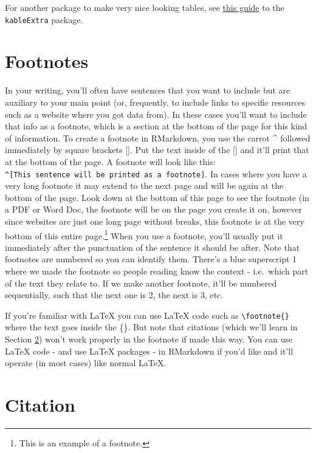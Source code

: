 \documentclass[
  12pt,
]{book}
\begin{document}
For another package to make very nice looking tables, see \href{https://cran.r-project.org/web/packages/kableExtra/vignettes/awesome_table_in_html.html}{this guide} to the \texttt{kableExtra} package.

\hypertarget{footnotes}{%
\section{Footnotes}\label{footnotes}}

In your writing, you'll often have sentences that you want to include but are auxiliary to your main point (or, frequently, to include links to specific resources such as a website where you got data from). In these cases you'll want to include that info as a footnote, which is a section at the bottom of the page for this kind of information. To create a footnote in RMarkdown, you use the carrot \^{} followed immediately by square brackets {[}{]}. Put the text inside of the {[}{]} and it'll print that at the bottom of the page. A footnote will look like this: \texttt{\^{}{[}This\ sentence\ will\ be\ printed\ as\ a\ footnote{]}}. In cases where you have a very long footnote it may extend to the next page and will be again at the bottom of the page. Look down at the bottom of this page to see the footnote (in a PDF or Word Doc, the footnote will be on the page you create it on, however since websites are just one long page without breaks, this footnote is at the very bottom of this entire page.\footnote{This is an example of a footnote.} When you use a footnote, you'll usually put it immediately after the punctuation of the sentence it should be after. Note that footnotes are numbered so you can identify them. There's a blue superscript 1 where we made the footnote so people reading know the context - i.e.~which part of the text they relate to. If we make another footnote, it'll be numbered sequentially, such that the next one is 2, the next is 3, etc.

If you're familiar with LaTeX you can use LaTeX code such as \texttt{\textbackslash{}footnote\{\}} where the text goes inside the \{\}. But note that citations (which we'll learn in Section \ref{citation}) won't work properly in the footnote if made this way. You can use LaTeX code - and use LaTeX packages - in RMarkdown if you'd like and it'll operate (in most cases) like normal LaTeX.

\hypertarget{citation}{%
\section{Citation}\label{citation}}
\end{document}
